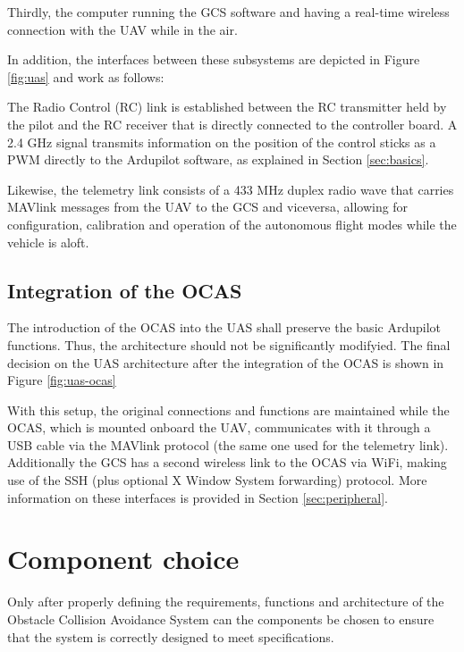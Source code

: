 Thirdly, the computer running the GCS software and having a real-time wireless connection with the UAV while in the air.



In addition, the interfaces between these subsystems are depicted in Figure \ref{fig:uas} and work as follows:

The Radio Control (RC) link is established between the RC transmitter held by the pilot and the RC receiver that is directly connected to the controller board.
A 2.4 GHz signal transmits information on the position of the control sticks as a PWM directly to the Ardupilot software, as explained in Section \ref{sec:basics}.

Likewise, the telemetry link consists of a 433 MHz duplex radio wave that carries MAVlink messages from the UAV to the GCS and viceversa, allowing for configuration, calibration and operation of the autonomous flight modes while the vehicle is aloft.

\subsection{Integration of the OCAS} \label{sec:ocasintegration}

The introduction of the OCAS into the UAS shall preserve the basic Ardupilot functions.
Thus, the architecture should not be significantly modifyied.
The final decision on the UAS architecture after the integration of the OCAS is shown in Figure \ref{fig:uas-ocas}



With this setup, the original connections and functions are maintained while the OCAS, which is mounted onboard the UAV, communicates with it through a USB cable via the MAVlink protocol (the same one used for the telemetry link).
Additionally the GCS has a second wireless link to the OCAS via WiFi, making use of the SSH (plus optional X Window System forwarding) protocol.
More information on these interfaces is provided in Section \ref{sec:peripheral}.


\section{Component choice} \label{sec:choice}

Only after properly defining the requirements, functions and architecture of the Obstacle Collision Avoidance System can the components be chosen to ensure that the system is correctly designed to meet specifications.

